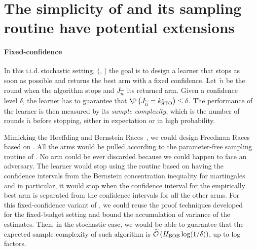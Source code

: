 \section{The simplicity of \Pone{} and its sampling routine have potential extensions}\label{s:exte}
%

%
\paragraph{Fixed-confidence}
In this i.i.d.\,stochastic setting, (\citealp{Maron93HR}, \citealp{Even-Dar06AE,Mnih08EB,
	Kalyanakrishnan12PA,Kaufmann13IC,Garivier16OB}) the goal is to 
design a learner that stops as soon as possible 
and returns the best arm with a fixed confidence.
Let~$\widetilde{n}$ be the round when the algorithm stops and 
$J_{\widetilde{n}}$ its returned arm. Given a 
confidence level $\delta$, the learner has to guarantee 
that $\Pro\left(\recomArm_{\widetilde{n}}= 
\bestArmSto\right) \leq \delta$. The performance of 
the learner is then measured by its \textit{sample 
	complexity}, which is the number of rounds $\widetilde{n}$ before stopping, 
either in expectation or in high probability.

Mimicking the Hoeffding and Bernstein Races~\citep{Maron93HR,
	Mnih08EB}, we could design Freedman Races based on \Pone{}. %
All the arms would be pulled according to 
the parameter-free sampling routine of \Pone{}. No arm could be ever discarded because we could happen to face an adversary.
The learner would stop using the \Pone{} routine based on having the confidence intervals from the Bernstein concentration 
inequality for martingales and in particular, it would stop when the confidence interval for the empirically best 
arm is separated from the confidence intervals for all the other arms.
For this fixed-confidence variant of  \Pone{}, we could reuse the proof 
techniques developed for the fixed-budget setting and bound the 
accumulation of variance of the estimates. Then, in the stochastic case, we would be 
able to guarantee that the expected 
sample complexity of such  algorithm is $\widetilde{\mathcal{O}}\left(H_{{\normalfont \textsc{{BOB}}}}\log(1/\delta)\right)$, up to log factors. %

